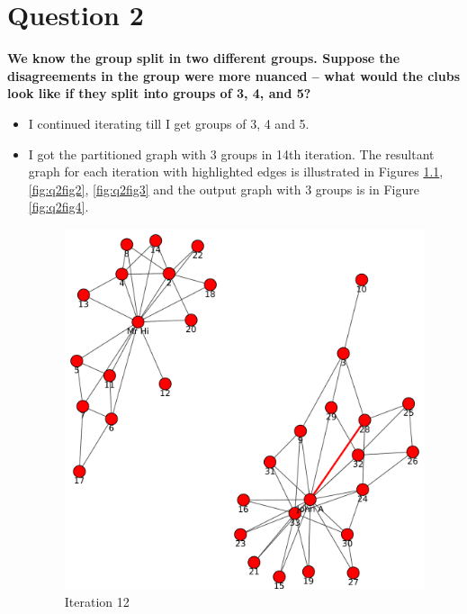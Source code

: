 \chapter{Question 2}
\label{avoiding-uri-aliases} 

\textbf{ We know the group split in two different groups.  Suppose the disagreements in the group were more nuanced -- what would the clubs look like if they split into groups of 3, 4, and 5?}

\begin{itemize}
\item I continued iterating till I get groups of 3, 4 and 5.
\newpage
\item I got the partitioned graph with 3 groups in 14th iteration. The resultant graph for each iteration with highlighted edges is illustrated in Figures \ref{fig:q2fig1}, \ref{fig:q2fig2}, \ref{fig:q2fig3} and the output graph with 3 groups is in Figure \ref{fig:q2fig4}.
\begin{figure}[h!]
\begin{center}
\includegraphics[scale=0.55, keepaspectratio=true]{figures/graphs/EdgeHighlightedGraph12.pdf}
\caption{Iteration 12}
\label{fig:q2fig1}
\end{center}
\end{figure}
\newpage
\begin{figure}[h!]

\end{figure}
\end{itemize}

